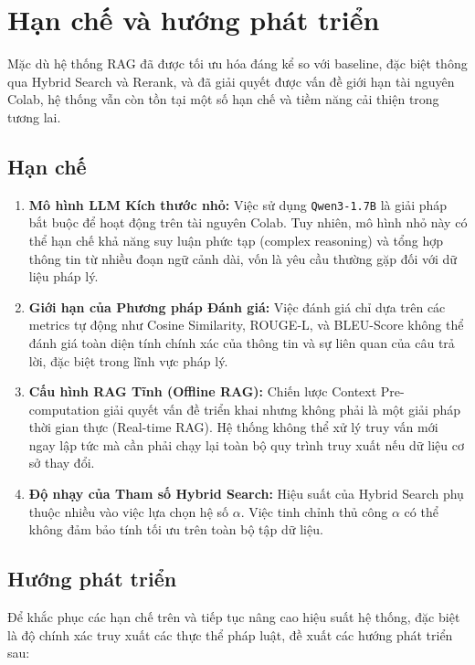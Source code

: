 \section{Hạn chế và hướng phát triển}

Mặc dù hệ thống RAG đã được tối ưu hóa đáng kể so với baseline, đặc biệt thông qua Hybrid
Search và Rerank, và đã giải quyết được vấn đề giới hạn tài nguyên Colab, hệ thống vẫn còn
tồn tại một số hạn chế và tiềm năng cải thiện trong tương lai.

\subsection{Hạn chế}

\begin{enumerate}
    \item \textbf{Mô hình LLM Kích thước nhỏ:} Việc sử dụng \texttt{Qwen3-1.7B} là giải pháp bắt buộc để hoạt
    động trên tài nguyên Colab. Tuy nhiên, mô hình nhỏ này có thể hạn chế khả năng suy
    luận phức tạp (complex reasoning) và tổng hợp thông tin từ nhiều đoạn ngữ cảnh dài, vốn
    là yêu cầu thường gặp đối với dữ liệu pháp lý.

    \item \textbf{Giới hạn của Phương pháp Đánh giá:} Việc đánh giá chỉ dựa trên các metrics tự động như
    Cosine Similarity, ROUGE-L, và BLEU-Score không thể đánh giá toàn diện tính chính
    xác của thông tin và sự liên quan của câu trả lời, đặc biệt trong lĩnh vực pháp lý.

    \item \textbf{Cấu hình RAG Tĩnh (Offline RAG):} Chiến lược Context Pre-computation giải quyết vấn
    đề triển khai nhưng không phải là một giải pháp thời gian thực (Real-time RAG). Hệ
    thống không thể xử lý truy vấn mới ngay lập tức mà cần phải chạy lại toàn bộ quy trình
    truy xuất nếu dữ liệu cơ sở thay đổi.

    \item \textbf{Độ nhạy của Tham số Hybrid Search:} Hiệu suất của Hybrid Search phụ thuộc nhiều vào
    việc lựa chọn hệ số $\alpha$. Việc tinh chỉnh thủ công $\alpha$ có thể không đảm bảo tính tối ưu trên
    toàn bộ tập dữ liệu.
\end{enumerate}

\subsection{Hướng phát triển}

Để khắc phục các hạn chế trên và tiếp tục nâng cao hiệu suất hệ thống, đặc biệt là độ chính
xác truy xuất các thực thể pháp luật, đề xuất các hướng phát triển sau:

